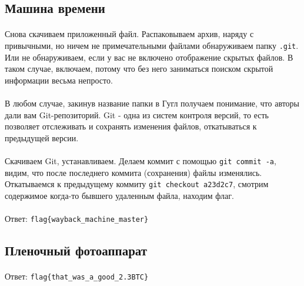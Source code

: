 \documentclass[12pt]{article}
\begin{document}

    \subsection{Машина времени}
	\paragraph{}
    Снова скачиваем приложенный файл.
	Распаковываем архив, наряду с привычными, но ничем не примечательными файлами обнаруживаем папку \verb|.git|.
	Или не обнаруживаем, если у вас не включено отображение скрытых файлов.
	В таком случае, включаем, потому что без него заниматься поиском скрытой информации весьма непросто.
    \paragraph{}
	В любом случае, закинув название папки в Гугл получаем понимание, что авторы дали вам Git-репозиторий.
	Git - одна из систем контроля версий, то есть позволяет отслеживать и сохранять изменения файлов,
	откатываться к предыдущей версии.
    \paragraph{}
	Скачиваем Git, устанавливаем.
	Делаем коммит с помощью \verb|git commit -a|, видим, что после последнего коммита (сохранения) файлы изменялись.
	Откатываемся к предыдущему коммиту \verb|git checkout a23d2c7|,
    смотрим содержимое когда-то бывшего удаленным файла, находим флаг.
    \paragraph{}
    Ответ: \verb|flag{wayback_machine_master}|


    \subsection{Пленочный фотоаппарат}
    \paragraph{}
    \paragraph{}
    Ответ: \verb|flag{that_was_a_good_2.3BTC}|
\end{document}
